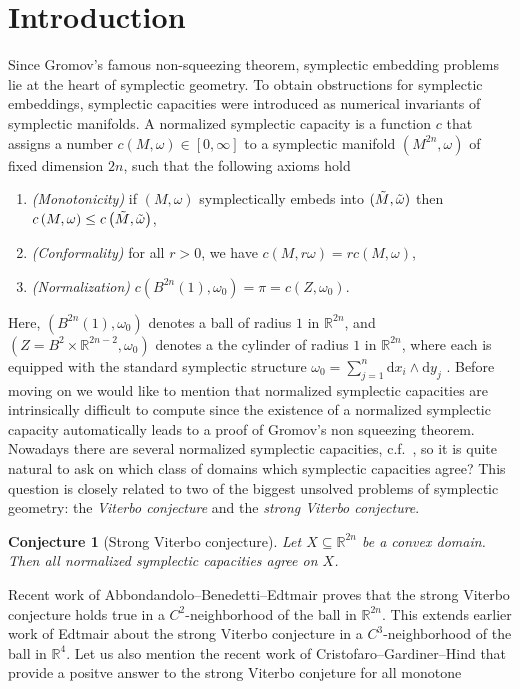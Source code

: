 \documentclass[12pt]{article}
\newtheorem{Conjecture}[Definition]{Conjecture}
\newcommand{\R}{\mathbb{R}} %
\newcommand{\dd}{\mathrm{d}}
\begin{document}
\section{Introduction}
Since Gromov's famous non-squeezing theorem, symplectic embedding problems lie at the heart of symplectic geometry. To obtain obstructions for symplectic embeddings, symplectic capacities were introduced as numerical invariants of symplectic manifolds. A normalized symplectic capacity is a function $c$ that assigns a number $c(M,\omega)\in[0,\infty]$ to a symplectic manifold $(M^{2n},\omega)$ of fixed dimension $2n$, such that the following axioms hold \begin{enumerate}
    \item \textit{(Monotonicity)} if $(M,\omega)$ symplectically embeds into $(\Tilde{M}, \Tilde{\omega})$ then $c\left(M, \omega \right)\leq c\left(\Tilde{M}, \Tilde{\omega} \right)$,
    \item \textit{(Conformality)} for all $r>0$, we have $c\left(M,r\omega \right)= r c\left(M,\omega \right)$,
    \item \textit{(Normalization)} $c\left(B^{2n}(1), \omega_0\right)=\pi= c\left( Z, \omega_0\right)$.
\end{enumerate}
 Here, $\left(B^{2n}(1),\omega_0 \right)$ denotes a ball of radius $1$ in $\R^{2n}$, and $\left( Z= B^2\times \R^{2n-2},\omega_0\right) $ denotes a
 the cylinder of radius $1$ in $\R^{2n}$, where each is equipped with the standard symplectic structure $\omega_0=\sum_{j=1}^n \dd x_i\wedge \dd y_j$ . Before moving on we would like to mention that normalized symplectic capacities are intrinsically difficult to compute since the existence of a normalized symplectic capacity automatically leads to a proof of Gromov's non squeezing theorem.  Nowadays there are several normalized symplectic capacities, c.f.\ \cite{CHLS}, so it is quite natural to ask on which class of domains which symplectic capacities agree?   
This question is closely related to two of the biggest unsolved problems of symplectic geometry:
the \emph{Viterbo conjecture} and the \emph{strong Viterbo conjecture}. 
\begin{Conjecture}[Strong Viterbo conjecture]\label{Strong Viterbor conj}
    Let $X\subseteq\R^{2n}$ be a convex domain. Then all normalized symplectic capacities agree on $X$.
\end{Conjecture}
\noindent
Recent work of Abbondandolo--Benedetti--Edtmair \cite{ABE24} proves that the strong Viterbo conjecture holds true in a $C^2$-neighborhood of the ball in $\R^{2n}$. This extends earlier work of Edtmair \cite{E23di} about the strong Viterbo conjecture in a $C^3$-neighborhood of the ball in $\R^{4}$. Let us also mention the recent work of Cristofaro--Gardiner--Hind \cite{CGH23} that provide a positve answer to the strong Viterbo conjeture for all monotone
\end{document}
